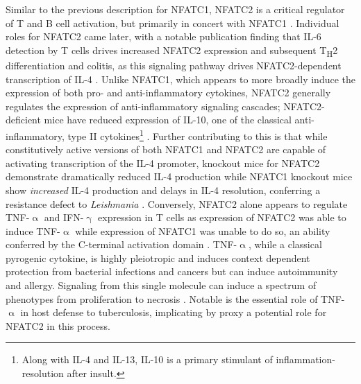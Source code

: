 Similar to the previous description for NFATC1, NFATC2 is a critical regulator of T and B cell activation, but primarily in concert with NFATC1 \citep{Peng2001}. Individual roles for NFATC2 came later, with a notable publication finding that IL\hyp{}6 detection by T cells drives increased NFATC2 expression and subsequent T\textsubscript{H}2 differentiation and colitis, as this signaling pathway drives NFATC2\hyp{}dependent transcription of IL\hyp{}4 \citep{Diehl2002, Weigmann2008}. Unlike NFATC1, which appears to more broadly induce the expression of both pro\hyp{} and anti\hyp{}inflammatory cytokines, NFATC2 generally regulates the expression of anti\hyp{}inflammatory signaling cascades; NFATC2\hyp{}deficient mice have reduced expression of IL\hyp{}10, one of the classical anti\hyp{}inflammatory, type II cytokines\footnote{Along with IL\hyp{}4 and IL\hyp{}13, IL\hyp{}10 is a primary stimulant of inflammation\hyp{}resolution after insult.} \citep{Lee2009}. Further contributing to this is that while constitutively active versions of both NFATC1 and NFATC2 are capable of activating transcription of the IL\hyp{}4 promoter, knockout mice for NFATC2 demonstrate dramatically reduced IL\hyp{}4 production while NFATC1 knockout mice show \textit{increased} IL\hyp{}4 production \citep{Monticelli2002} and delays in IL\hyp{}4 resolution, conferring a resistance defect to \textit{Leishmania} \citep{Kiani1997}. Conversely, NFATC2 alone appears to regulate TNF\hyp{}$\upalpha$ and IFN\hyp{}$\upgamma$ expression in T cells as expression of NFATC2 was able to induce TNF\hyp{}$\upalpha$ while expression of NFATC1 was unable to do so, an ability conferred by the C\hyp{}terminal activation domain \citep{Kaminuma2008, Teixeira2005}. TNF\hyp{}$\upalpha$, while a classical pyrogenic cytokine, is highly pleiotropic and induces context dependent protection from bacterial infections and cancers but can induce autoimmunity and allergy. Signaling from this single molecule can induce a spectrum of phenotypes from proliferation to necrosis \citep{Gough2020}. Notable is the essential role of TNF\hyp{}$\upalpha$ in host defense to tuberculosis, implicating by proxy a potential role for NFATC2 in this process. 

